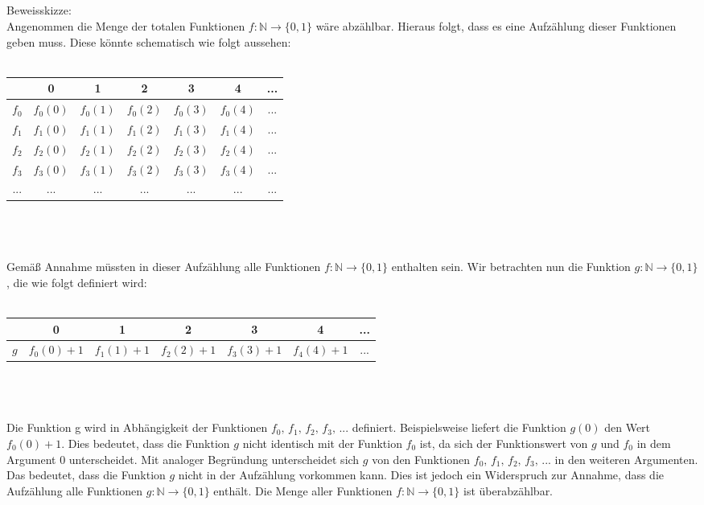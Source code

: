 \documentclass[a4paper,12pt,titlepage]{article}
\begin{document}
\subsection{}
Beweisskizze:\\
Angenommen die Menge der totalen Funktionen $f :  \mathbb{N} \rightarrow \{0,1\}$ wäre abzählbar. Hieraus folgt, dass es eine Aufzählung dieser Funktionen geben muss. Diese könnte schematisch wie folgt aussehen:\\
\\
\begin{tabular}{|c||c|c|c|c|c|c|}
\hline
&0&1&2&3&4&...\\
\hline
\hline
$f_0$&$f_0(0)$&$f_0(1)$&$f_0(2)$&$f_0(3)$&$f_0(4)$&...\\
\hline
$f_1$&$f_1(0)$&$f_1(1)$&$f_1(2)$&$f_1(3)$&$f_1(4)$&...\\
\hline
$f_2$&$f_2(0)$&$f_2(1)$&$f_2(2)$&$f_2(3)$&$f_2(4)$&...\\
\hline
$f_3$&$f_3(0)$&$f_3(1)$&$f_3(2)$&$f_3(3)$&$f_3(4)$&...\\
\hline
...&...&...&...&...&...&...\\
\hline
\end{tabular}
\\
\\
\\
Gemäß Annahme müssten in dieser Aufzählung alle Funktionen  $f :  \mathbb{N} \rightarrow \{0,1\}$ enthalten sein. Wir betrachten nun die Funktion $g:  \mathbb{N} \rightarrow \{0,1\}$, die wie folgt definiert wird:\\
\\
\begin{tabular}{|c||c|c|c|c|c|c|}
\hline
&0&1&2&3&4&...\\
\hline
\hline
$g$&$f_0(0)+1$&$f_1(1)+1$&$f_2(2)+1$&$f_3(3)+1$&$f_4(4)+1$&...\\
\hline
\end{tabular}\\
\\
\\
Die Funktion g wird in Abhängigkeit der Funktionen $f_0\text{, }f_1\text{, }f_2\text{, }f_3\text{, ...}$ definiert. 
Beispielsweise liefert die Funktion $g(0)$ den Wert $f_0(0)+1$. Dies bedeutet, dass die Funktion $g$ nicht identisch mit der Funktion $f_0$ ist, da sich der Funktionswert von $g$ und $f_0$ in dem Argument 0 unterscheidet. Mit analoger Begründung unterscheidet sich $g$ von den Funktionen $f_0\text{, }f_1\text{, }f_2\text{, }f_3\text{, ...}$ in den weiteren Argumenten. Das bedeutet, dass die Funktion $g$ nicht in der Aufzählung vorkommen kann. Dies ist jedoch ein Widerspruch zur Annahme, dass die Aufzählung alle Funktionen $g: \mathbb{N} \rightarrow \{0,1\}$ enthält.
Die Menge aller Funktionen $f: \mathbb{N} \rightarrow \{0,1\}$ ist überabzählbar.
\end{document}
